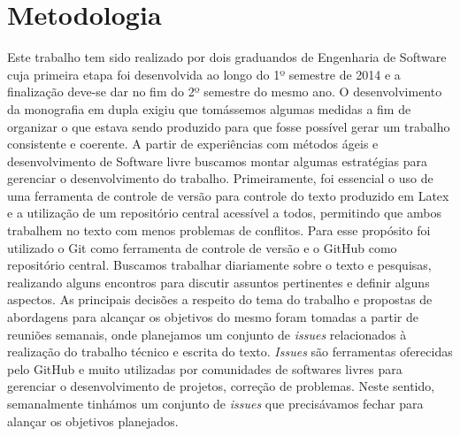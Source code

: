 \section{Metodologia}
\label{sec:methodology}

Este trabalho tem sido realizado por dois graduandos de Engenharia de Software cuja primeira etapa foi desenvolvida ao longo do 1º semestre de 2014 e a finalização deve-se dar no fim do 2º semestre do mesmo ano.
%
O desenvolvimento da monografia em dupla exigiu que tomássemos algumas medidas a fim de organizar o que estava sendo produzido para que fosse possível gerar um trabalho consistente e coerente.
%
A partir de experiências com métodos ágeis e desenvolvimento de Software livre buscamos montar algumas estratégias para gerenciar o desenvolvimento do trabalho.
%
Primeiramente, foi essencial o uso de uma ferramenta de controle de versão para controle do texto produzido em Latex e a utilização de um repositório central acessível a todos, permitindo que ambos trabalhem no texto com menos problemas de conflitos.
%
Para esse propósito foi utilizado o Git como ferramenta de controle de versão e o GitHub como repositório central.
%
Buscamos trabalhar diariamente sobre o texto e pesquisas, realizando alguns encontros para discutir assuntos pertinentes e definir alguns aspectos. As principais decisões a respeito do tema do trabalho e propostas de abordagens para alcançar os objetivos do mesmo foram tomadas a partir de reuniões semanais, onde planejamos um conjunto de \emph{issues} relacionados à realização do trabalho técnico e escrita do texto.
%
\emph{Issues} são ferramentas oferecidas pelo GitHub e muito utilizadas por comunidades de softwares livres para gerenciar o desenvolvimento de projetos, correção de problemas. Neste sentido, semanalmente tinhámos um conjunto de \emph{issues} que precisávamos fechar para alançar os objetivos planejados.
